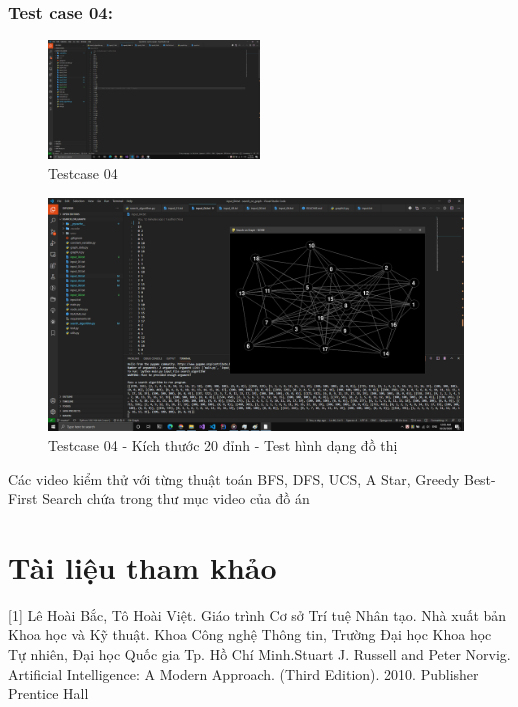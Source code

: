 \documentclass{article}
\begin{document}
\subsubsection{Test case 04:}
\begin{figure}[H]
\centering
\includegraphics[width=0.5\textwidth]{Test_Case_04.png}
\caption{Testcase 04}
\end{figure}
\begin{figure}[H]
\centering
\includegraphics[width=0.98\textwidth]{Test_Case_04_Content.png}
\caption{Testcase 04 - Kích thước 20 đỉnh - Test hình dạng đồ thị}
\end{figure}

Các video kiểm thử với từng thuật toán BFS, DFS, UCS, A Star, Greedy Best-First Search chứa trong thư mục video của đồ án

\newpage

\section{Tài liệu tham khảo}
[1] Lê Hoài Bắc, Tô Hoài Việt. Giáo trình Cơ sở Trí tuệ Nhân tạo. Nhà xuất bản Khoa học và Kỹ thuật. Khoa Công nghệ Thông tin, Trường Đại học Khoa học Tự nhiên, Đại học Quốc gia Tp. Hồ Chí Minh.\newline
[2] Stuart J. Russell and Peter Norvig. Artificial Intelligence: A Modern Approach. (Third Edition). 2010. Publisher Prentice Hall
\newpage
\end{document}
